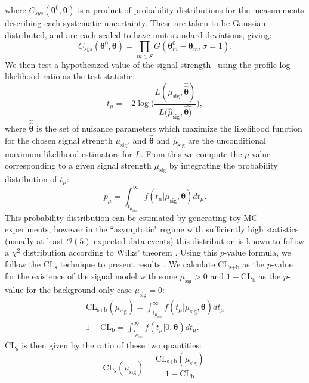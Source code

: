 where $C_{sys}(\boldsymbol{\theta}^0,\boldsymbol{\theta})$ is a product of probability distributions for the measurements describing each systematic uncertainty. These are taken to be Gaussian distributed, and are each scaled to have unit standard deviations, giving:
\begin{equation}
C_{sys}(\boldsymbol{\theta}^0,\boldsymbol{\theta}) = \prod_{m\in S} G(\boldsymbol{\theta}^{0}_{m} - \boldsymbol{\theta}_m, \sigma = 1).
\end{equation}
We then test a hypothesized value of the signal strength \mu~using the profile log-likelihood ratio as the test statistic:
\begin{equation}
\label{eq:prof_likelihood_ratio}
t_{\mu} = -2\log\Bigg( \frac{L(\mu_\text{sig}, \hat{\hat{\boldsymbol{\theta}}})}{L(\hat{\mu}_\text{sig}, \hat{\boldsymbol{\theta})}} \Bigg),
\end{equation}
where $\hat{\hat{\boldsymbol{\theta}}}$ is the set of nuisance parameters which maximize the likelihood function for the chosen signal strength $\mu_{\text{sig}}$, and $\hat{\boldsymbol{\theta}}$ and $\hat{\mu}_{\text{sig}}$ are the unconditional maximum-likelihood estimators for $L$. From this we compute the $p$-value corresponding to a given signal strength $\mu_{\text{sig}}$ by integrating the probability distribution of $t_{\mu}$:
\begin{equation}
p_{\mu} = \int_{t_{\mu_\text{obs}}}^\infty f(t_{\mu}|\mu_\text{sig}, \boldsymbol{\theta})dt_{\mu}.
\end{equation}
This probability distribution can be estimated by generating toy MC experiments, however in the ``asymptotic" regime with sufficiently high statistics (usually at least $\mathcal{O}(5)$ expected data events) this distribution is known to follow a $\chi^2$ distribution according to Wilks' theorem \cite{Wilks}.
Using this $p$-value formula, we follow the $\text{CL}_\text{s}$ technique to present results \cite{CLs}. We calculate $\text{CL}_\text{s+b}$ as the $p$-value for the existence of the signal model with some $\mu_{\text{sig}} > 0$ and $1 - \text{CL}_\text{b}$ as the $p$-value for the background-only case $\mu_{\text{sig}} = 0$:
\begin{equation}
\begin{gathered}
\text{CL}_\text{s+b}(\mu_\text{sig}) = \int_{t_{\mu_\text{obs}}}^\infty f(t_{\mu}|\mu_\text{sig}, \boldsymbol{\theta})dt_{\mu} \\
1 - \text{CL}_\text{b} = \int_{t_{\mu_\text{obs}}}^\infty f(t_{\mu}|0, \boldsymbol{\theta})dt_{\mu}.
\end{gathered}
\end{equation}
$\text{CL}_\text{s}$ is then given by the ratio of these two quantities:
\begin{equation}
\text{CL}_\text{s}(\mu_\text{sig}) = \frac{\text{CL}_\text{s+b}(\mu_\text{sig})}{1 - \text{CL}_\text{b}}.
\end{equation}

